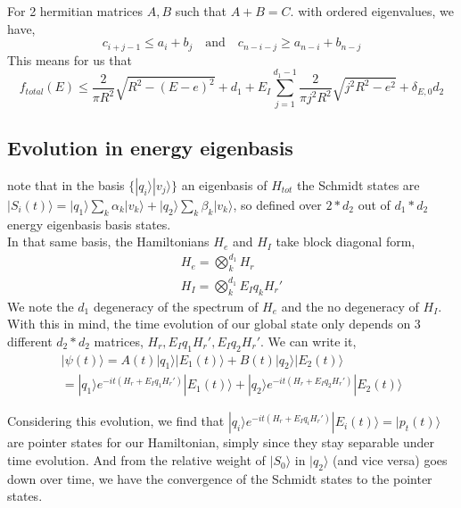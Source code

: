 \documentclass{article}
\begin{document}
For 2 hermitian matrices $A,B$ such that $A+B=C$. with ordered eigenvalues, we have,
\begin{equation}
    c_{i+j-1}\leq a_i+b_j\quad\text{and}\quad c_{n-i-j}\geq a_{n-i}+b_{n-j}
\end{equation}
This means for us that
\begin{equation}
    f_{total}(E)\leq \frac{2}{\pi R^2}\sqrt{R^2-(E-e)^2} + d_1 + E_I\sum^{d_1-1}_{j=1}\frac{2}{\pi j^2 R^2}\sqrt{j^2R^2-e^2} +\delta_{E,0}d_2
\end{equation}

\subsection{Evolution in energy eigenbasis}
note that in the basis $\{|q_i\rangle|v_j\rangle\}$ an eigenbasis of $H_{tot}$ the Schmidt states are $|S_i(t)\rangle = |q_1\rangle\sum_k\alpha_k|v_k\rangle + |q_2\rangle\sum_k\beta_k|v_k\rangle$, so defined over $2*d_2$ out of $d_1*d_2$ energy eigenbasis basis states. \\
In that same basis, the Hamiltonians $H_e$ and $H_I$ take block diagonal form,
\begin{align*}
    H_e = \bigotimes^{d_1}_kH_{r}\\
    H_I = \bigotimes^{d_1}_kE_Iq_kH_{r}'
\end{align*}
We note the $d_1$ degeneracy of the spectrum of $H_e$ and the no degeneracy of $H_I$.\\

With this in mind, the time evolution of our global state only depends on 3 different $d_2*d_2$ matrices, $H_r, E_Iq_1H_r', E_Iq_2H_r'$. We can write it,
\begin{align*}
    |\psi(t)\rangle = A(t)|q_1\rangle|E_1(t)\rangle+B(t)|q_2\rangle|E_2(t)\rangle\\
    =|q_1\rangle e^{-it(H_r + E_Iq_1H_r')}|E_1(t)\rangle+|q_2\rangle e^{-it(H_r + E_Iq_2H_r')}|E_2(t)\rangle
\end{align*}

Considering this evolution, we find that $|q_i\rangle e^{-it(H_r + E_Iq_iH_r')}|E_i(t)\rangle = |p_t(t)\rangle$ are pointer states for our Hamiltonian, simply since they stay separable under time evolution. And from the relative weight of $|S_0\rangle$ in $|q_2\rangle$ (and vice versa) goes down over time, we have the convergence of the Schmidt states to the pointer states. \\ 
\end{document}
